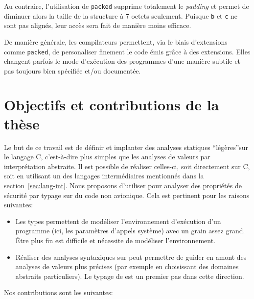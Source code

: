 Au contraire, l'utilisation de \texttt{packed} supprime totalement le
\emph{padding} et permet de diminuer alors la taille de la structure à 7 octets
seulement. Puisque \texttt{b} et \texttt{c} ne sont pas alignés, leur accès sera
fait de manière moins efficace.

De manière générale, les compilateurs permettent, via le biais d'extensions
comme \texttt{packed}, de personaliser finement le code émis grâce à des
extensions. Elles changent parfois le mode d'exécution des programmes d'une
manière subtile et pas toujours bien spécifiée et/ou documentée.

\section{Objectifs et contributions de la thèse}

Le but de ce travail est de définir et implanter des analyses statiques
\enquote{légères}sur le langage C, c'est-à-dire plus simples que les analyses de
valeurs par interprétation abstraite. Il est possible de réaliser celles-ci,
soit directement sur C, soit en utilisant un des langages intermédiaires
mentionnés dans la section~\ref{sec:lang-int}. Nous proposons d'utiliser
\newspeak pour analyser des propriétés de sécurité par typage sur du code non
avionique. Cela est pertinent pour les raisons suivantes:

\begin{itemize}

\item
Les types permettent de modéliser l'environnement d'exécution d'un
programme (ici, les paramètres d'appels système) avec un grain assez grand. Être
plus fin est difficile et nécessite de modéliser l'environnement.

\item
Réaliser des analyses syntaxiques sur \newspeak peut permettre de guider en
amont des analyses de valeurs plus précises (par exemple en choisissant des
domaines abstraits particuliers). Le typage de \newspeak est un premier pas dans
cette direction.

\end{itemize}

Nos contributions sont les suivantes:

